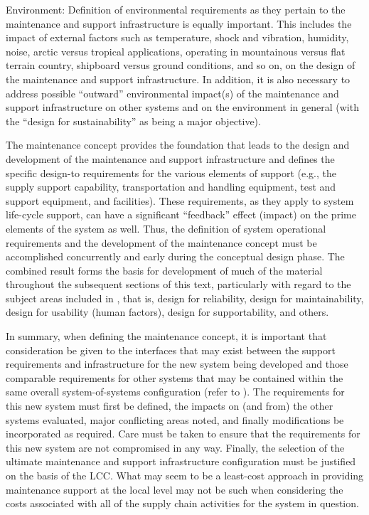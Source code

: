 Environment: Definition of environmental requirements as they pertain to the maintenance and support infrastructure is equally important. This includes the impact of external factors such as temperature, shock and vibration, humidity, noise, arctic versus tropical applications, operating in mountainous versus flat terrain country, shipboard versus ground conditions, and so on, on the design of the maintenance and support infrastructure. In addition, it is also necessary to address possible ``outward'' environmental impact(s) of the maintenance and support infrastructure on other systems and on the environment in general (with the ``design for sustainability'' as being a major objective).

The maintenance concept provides the foundation that leads to the design and development of the maintenance and support infrastructure and defines the specific design-to requirements for the various elements of support (e.g., the supply support capability, transportation and handling equipment, test and support equipment, and facilities). These requirements, as they apply to system life-cycle support, can have a significant ``feedback'' effect (impact) on the prime elements of the system as well. Thus, the definition of system operational requirements and the development of the maintenance concept must be accomplished concurrently and early during the conceptual design phase. The combined result forms the basis for development of much of the material throughout the subsequent sections of this text, particularly with regard to the subject areas included in , that is, design for reliability, design for maintainability, design for usability (human factors), design for supportability, and others.

In summary, when defining the maintenance concept, it is important that consideration be given to the interfaces that may exist between the support requirements and infrastructure for the new system being developed and those comparable requirements for other systems that may be contained within the same overall system-of-systems configuration (refer to ). The requirements for this new system must first be defined, the impacts on (and from) the other systems evaluated, major conflicting areas noted, and finally modifications be incorporated as required. Care must be taken to ensure that the requirements for this new system are not compromised in any way. Finally, the selection of the ultimate maintenance and support infrastructure configuration must be justified on the basis of the LCC. What may seem to be a least-cost approach in providing maintenance support at the local level may not be such when considering the costs associated with all of the supply chain activities for the system in question.

